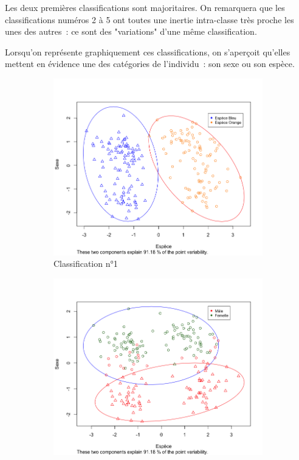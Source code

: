 \documentclass[a4paper,10pt]{report}
\begin{document}
Les deux premières classifications sont majoritaires. On remarquera que les classifications numéros 2 à 5 ont toutes une inertie intra-classe très proche les unes des autres~: ce sont des "variations" d'une même classification.

Lorsqu'on représente graphiquement ces classifications, on s'aperçoit qu'elles mettent en évidence une des catégories de l'individu~: son sexe ou son espèce.

\begin{figure}[H]
	\centering
	\captionsetup{justification=centering, margin=3cm}
	\begin{subfigure}[b]{0.5\linewidth}
		\centering
		\captionsetup{justification=centering}
		\includegraphics[width=1\linewidth]{img/3-2-1-crabs-2-classes-classif-1-espece}
		\caption{\small Classification n°1}
		\label{fig:3-2-1-crabs-2-classes-classif-1-espece}
	\end{subfigure}%
	\begin{subfigure}[b]{0.5\linewidth}
		\centering
		\captionsetup{justification=centering}
		\includegraphics[width=1\linewidth]{img/3-2-1-crabs-2-classes-classif-2-sex}

\end{subfigure}
\end{figure}
\end{document}

